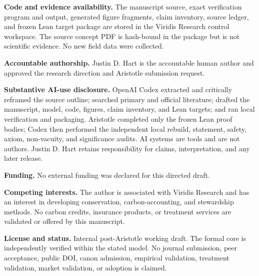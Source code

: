 \documentclass[10pt]{article}
\begin{document}
\textbf{Code and evidence availability.}  The manuscript source, exact
verification program and output, generated figure fragments, claim inventory,
source ledger, and frozen Lean target package are stored in the Viridis Research
control workspace.  The source concept PDF is hash-bound in the package but is
not scientific evidence.  No new field data were collected.

\textbf{Accountable authorship.}  Justin D. Hart is the accountable human
author and approved the research direction and Aristotle submission request.

\textbf{Substantive AI-use disclosure.}  OpenAI Codex extracted and critically
reframed the source outline; searched primary and official literature; drafted
the manuscript, model, code, figures, claim inventory, and Lean targets; and ran
local verification and packaging.  Aristotle completed only the frozen Lean
proof bodies; Codex then performed the independent local rebuild, statement,
safety, axiom, non-vacuity, and significance audits.  AI systems are tools and
are not authors.  Justin D. Hart
retains responsibility for claims, interpretation, and any later release.

\textbf{Funding.}  No external funding was declared for this directed draft.

\textbf{Competing interests.}  The author is associated with Viridis Research
and has an interest in developing conservation, carbon-accounting, and
stewardship methods.  No carbon credits, insurance products, or treatment
services are validated or offered by this manuscript.

\textbf{License and status.}  Internal post-Aristotle working draft.  The formal
core is independently verified within the stated model.  No journal submission,
peer acceptance, public DOI, canon admission, empirical validation, treatment
validation, market validation, or adoption is claimed.
\end{document}
